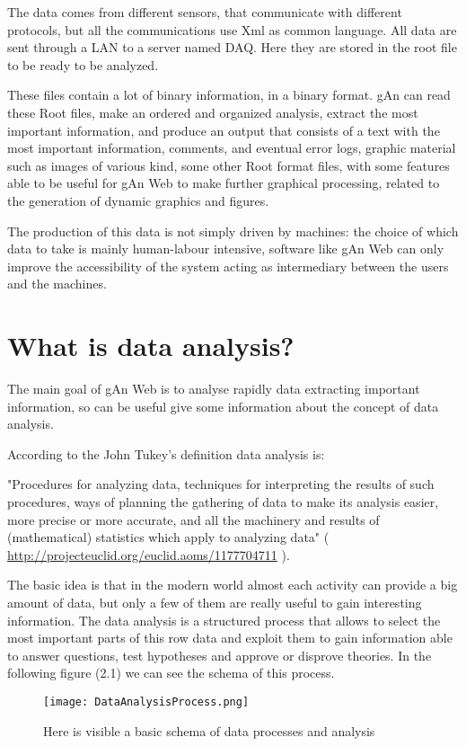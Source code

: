 The data comes from different sensors, that communicate with different protocols, but all the communications use Xml as common language. All data are sent through a LAN to a server named DAQ. Here they are stored in the root file to be ready to be analyzed.

These files contain a lot of binary information, in a binary format. gAn can read these Root files, make an ordered and organized analysis, extract the most important information, and produce an output that consists of a text with the most important information, comments, and eventual error logs, graphic material such as images of various kind, some other Root format files, with some features able to be useful  for gAn Web to make further graphical processing, related to the generation of dynamic graphics and figures. 

The production of this data is not simply driven by machines: the choice of which data to take is mainly human-labour intensive, software like gAn Web can only improve the accessibility of the system acting as intermediary between the users and the machines.


\section{What is data analysis?}

The main goal of gAn Web is to analyse rapidly data extracting important information, so can be useful give some information about the concept of data analysis.

According to the John Tukey's definition data analysis is: 

"Procedures for analyzing data, techniques for interpreting the results of such procedures, ways of planning the gathering of data to make its analysis easier, more precise or more accurate, and all the machinery and results of (mathematical) statistics which apply to analyzing data" 
( \url{http://projecteuclid.org/euclid.aoms/1177704711} ).

The basic idea is that in the modern world almost each activity can provide a big amount of data, but only a few of them are really useful to gain interesting information. The data analysis is a structured process that allows to select the most important parts of this row data and exploit them to gain information able to answer questions, test hypotheses and approve or disprove theories.
In the following figure (2.1) we can see the schema of this process. 

\begin{figure}[H]
\centering
\texttt{[image: DataAnalysisProcess.png]} 
\caption{Here is visible a basic schema of data processes and analysis}
\end{figure}

